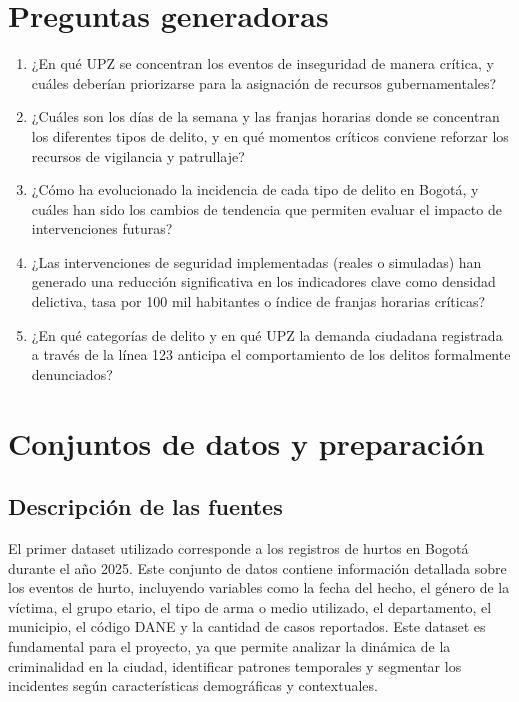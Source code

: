 \documentclass[12pt,letterpaper]{article}
\begin{document}
\section{Preguntas generadoras}

\begin{enumerate}
    \item ¿En qué UPZ se concentran los eventos de inseguridad de manera crítica, y cuáles deberían priorizarse para la asignación de recursos gubernamentales?
    \item ¿Cuáles son los días de la semana y las franjas horarias donde se concentran los diferentes tipos de delito, y en qué momentos críticos conviene reforzar los recursos de vigilancia y patrullaje?
    \item ¿Cómo ha evolucionado la incidencia de cada tipo de delito en Bogotá, y cuáles han sido los cambios de tendencia que permiten evaluar el impacto de intervenciones futuras?
    \item ¿Las intervenciones de seguridad implementadas (reales o simuladas) han generado una reducción significativa en los indicadores clave como densidad delictiva, tasa por 100 mil habitantes o índice de franjas horarias críticas?
    \item ¿En qué categorías de delito y en qué UPZ la demanda ciudadana registrada a través de la línea 123 anticipa el comportamiento de los delitos formalmente denunciados?
\end{enumerate}

\section{Conjuntos de datos y preparación}

\subsection{Descripción de las fuentes}

El primer dataset utilizado corresponde a los registros de hurtos en Bogotá durante el año 2025. Este conjunto de datos contiene información detallada sobre los eventos de hurto, incluyendo variables como la fecha del hecho, el género de la víctima, el grupo etario, el tipo de arma o medio utilizado, el departamento, el municipio, el código DANE y la cantidad de casos reportados. Este dataset es fundamental para el proyecto, ya que permite analizar la dinámica de la criminalidad en la ciudad, identificar patrones temporales y segmentar los incidentes según características demográficas y contextuales.
\end{document}
